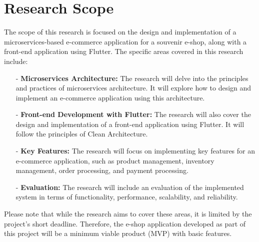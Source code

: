 \section{Research Scope}
The scope of this research is focused on the design and implementation of a microservices-based e-commerce application for a souvenir e-shop, along with a front-end application using Flutter.
The specific areas covered in this research include:
\begin{itemize}
    \item[-] \textbf{Microservices Architecture:} The research will delve into the principles and practices of microservices architecture. It will explore how to design and implement an e-commerce application using this architecture.
    \item[-] \textbf{Front-end Development with Flutter:} The research will also cover the design and implementation of a front-end application using Flutter. It will follow the principles of Clean Architecture.
    \item[-] \textbf{Key Features:} The research will focus on implementing key features for an e-commerce application, such as product management, inventory management, order processing, and payment processing.
    \item[-] \textbf{Evaluation:} The research will include an evaluation of the implemented system in terms of functionality, performance, scalability, and reliability.
\end{itemize}

Please note that while the research aims to cover these areas, it is limited by the project’s short deadline. Therefore, the e-shop application developed as part of this project will be a minimum viable product (MVP) with basic features.
